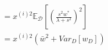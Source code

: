 \documentclass{article}
\theoremstyle{definition}
\theoremstyle{remark}
\begin{document}
\begin{enumerate}[font={\Large\bfseries},left=0pt]
\begin{enumerate}
\begin{align}
			                                                                        & = x^{(i)2}\mathbb{E}_{\mathcal{D}} \left[\left(\frac{s^2w^*}{\lambda + s^2}\right)^2\right]                                                                                                                                                                                                                  \\[2pt]
			                                                                        & = x^{(i)2}\left(\bar{w}^2 + Var_D[w_D] \right)                                                                                                                                                                                                                                                               \\[2pt]
		      \end{align}


\end{enumerate}
\end{enumerate}
\end{document}
